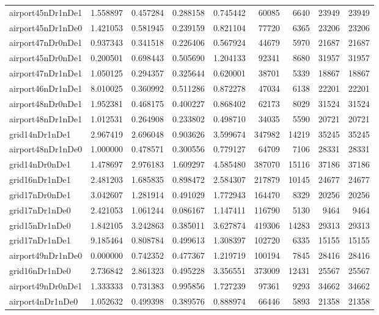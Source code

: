 \begin{longtable}{|l|r|r|r|r|r|r|r|r|}
airport45nDr1nDe1 & 1.558897 & 0.457284 & 0.288158 & 0.745442 & 60085 & 6640 & 23949 & 23949 \\
airport45nDr1nDe0 & 1.421053 & 0.581945 & 0.239159 & 0.821104 & 77720 & 6365 & 23206 & 23206 \\
airport47nDr0nDe1 & 0.937343 & 0.341518 & 0.226406 & 0.567924 & 44679 & 5970 & 21687 & 21687 \\
airport45nDr0nDe1 & 0.200501 & 0.698443 & 0.505690 & 1.204133 & 92341 & 8680 & 31957 & 31957 \\
airport47nDr1nDe1 & 1.050125 & 0.294357 & 0.325644 & 0.620001 & 38701 & 5339 & 18867 & 18867 \\
airport46nDr1nDe1 & 8.010025 & 0.360992 & 0.511286 & 0.872278 & 47034 & 6138 & 22201 & 22201 \\
airport48nDr0nDe1 & 1.952381 & 0.468175 & 0.400227 & 0.868402 & 62173 & 8029 & 31524 & 31524 \\
airport48nDr1nDe1 & 1.012531 & 0.264908 & 0.233802 & 0.498710 & 34035 & 5590 & 20721 & 20721 \\
grid14nDr1nDe1 & 2.967419 & 2.696048 & 0.903626 & 3.599674 & 347982 & 14219 & 35245 & 35245 \\
airport48nDr1nDe0 & 1.000000 & 0.478571 & 0.300556 & 0.779127 & 64709 & 7106 & 28331 & 28331 \\
grid14nDr0nDe1 & 1.478697 & 2.976183 & 1.609297 & 4.585480 & 387070 & 15116 & 37186 & 37186 \\
grid16nDr1nDe1 & 2.481203 & 1.685835 & 0.898472 & 2.584307 & 217879 & 10145 & 24677 & 24677 \\
grid17nDr0nDe1 & 3.042607 & 1.281914 & 0.491029 & 1.772943 & 164470 & 8329 & 20256 & 20256 \\
grid17nDr1nDe0 & 2.421053 & 1.061244 & 0.086167 & 1.147411 & 116790 & 5130 & 9464 & 9464 \\
grid15nDr1nDe0 & 1.842105 & 3.242863 & 0.385011 & 3.627874 & 419306 & 14283 & 29313 & 29313 \\
grid17nDr1nDe1 & 9.185464 & 0.808784 & 0.499613 & 1.308397 & 102720 & 6335 & 15155 & 15155 \\
airport49nDr1nDe0 & 0.000000 & 0.742352 & 0.477367 & 1.219719 & 100194 & 7845 & 28416 & 28416 \\
grid16nDr1nDe0 & 2.736842 & 2.861323 & 0.495228 & 3.356551 & 373009 & 12431 & 25567 & 25567 \\
airport49nDr0nDe1 & 1.333333 & 0.731383 & 0.995856 & 1.727239 & 97361 & 9293 & 34662 & 34662 \\
airport4nDr1nDe0 & 1.052632 & 0.499398 & 0.389576 & 0.888974 & 66446 & 5893 & 21358 & 21358 \\

\end{longtable}
